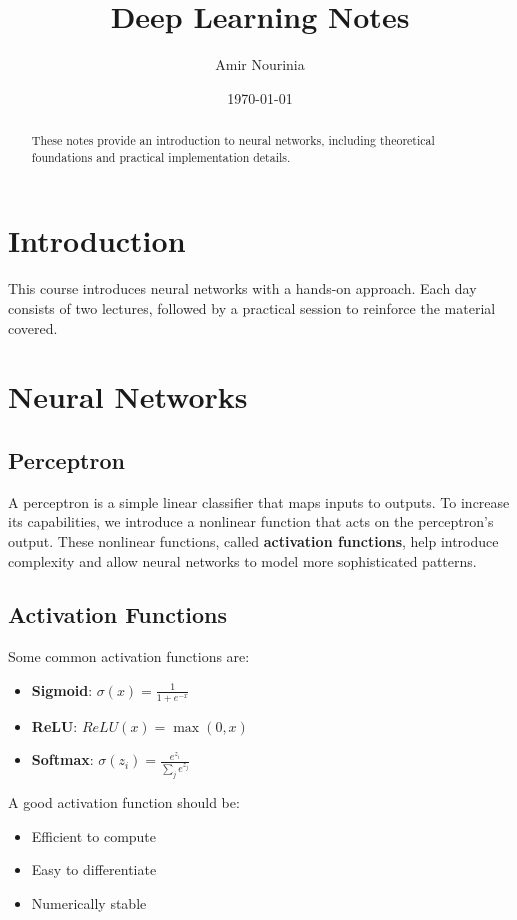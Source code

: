 \documentclass[a4paper,12pt]{article}
\title{\textbf{Deep Learning Notes}}
\author{Amir Nourinia}
\date{\today}
\begin{document}
\maketitle

\begin{abstract}
  These notes provide an introduction to neural networks, including theoretical foundations and practical implementation details.
\end{abstract}

\tableofcontents
\newpage

\section{Introduction}
This course introduces neural networks with a hands-on approach. Each day consists of two lectures,
followed by a practical session to reinforce the material covered.

\section{Neural Networks}

\subsection{Perceptron}
A perceptron is a simple linear classifier that maps inputs to outputs.
To increase its capabilities, we introduce a nonlinear function that acts on the perceptron's output.
These nonlinear functions, called \textbf{activation functions}, help introduce complexity and allow neural
networks to model more sophisticated patterns.

\subsection{Activation Functions}
Some common activation functions are:
\begin{itemize}
  \item \textbf{Sigmoid}: $\sigma(x) = \frac{1}{1+e^{-x}}$
  \item \textbf{ReLU}: $ReLU(x) = \max(0, x)$
  \item \textbf{Softmax}: $\sigma(z_i) = \frac{e^{z_i}}{\sum_{j} e^{z_j}}$
\end{itemize}
A good activation function should be:
\begin{itemize}
  \item Efficient to compute
  \item Easy to differentiate
  \item Numerically stable
\end{itemize}
\end{document}
